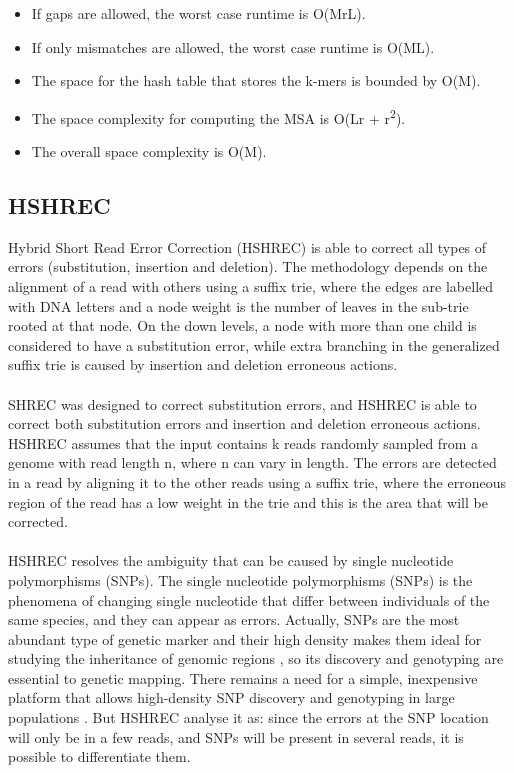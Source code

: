 \documentclass[12pt,openany]{llncs}
\begin{document}
\begin{itemize}
	\item If gaps are allowed, the worst case runtime is O(MrL).
	\item If only mismatches are allowed, the worst case runtime is O(ML).
	\item The space for the hash table that stores the k-mers is bounded by O(M).
	\item The space complexity for computing the MSA is O(Lr + r\textsuperscript{2}).
	\item The overall space complexity is O(M).
\end{itemize}

\subsection{HSHREC}
Hybrid Short Read Error Correction (HSHREC) \cite{HShrec} is able to correct all types of errors (substitution, insertion and deletion). The methodology depends on the alignment of a read with others using a suffix trie, where the edges are labelled with DNA letters and a node weight is the number of leaves in the sub-trie rooted at that node. On the down levels, a node with more than one child is considered to have a substitution error, while extra branching in the generalized suffix trie is caused by insertion and deletion erroneous actions.
\\
\\
SHREC was designed to correct substitution errors, and HSHREC is able to correct both substitution errors and insertion and deletion erroneous actions.
\\
HSHREC assumes that the input contains k reads randomly sampled from a genome with read length n, where n can vary in length. The errors are detected in a read by aligning it to the other reads using a suffix trie, where the erroneous region of the read has a low weight in the trie and this is the area that will be corrected.
\\
\\
HSHREC resolves the ambiguity that can be caused by single nucleotide polymorphisms (SNPs). The single nucleotide polymorphisms (SNPs) is the phenomena of changing single nucleotide that differ between individuals of the same species, and they can appear as errors. Actually, SNPs are the most abundant type of genetic marker and their high density makes them ideal for studying the inheritance of genomic regions \cite{SNP1,SNP2}, so its discovery and genotyping are essential to genetic mapping. There remains a need for a simple, inexpensive platform that allows high-density SNP discovery and genotyping in large populations \cite{SNP3}. But HSHREC analyse it as: since the errors at the SNP location will only be in a few reads, and SNPs will be present in several reads, it is possible to differentiate them.
\end{document}
